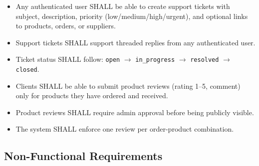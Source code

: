 \documentclass[12pt,onecolumn]{IEEEtran}
\begin{document}
\begin{tcolorbox}[reqbox,title={FR-SUPPORT: Support and Review Requirements}]
\begin{itemize}[leftmargin=1.5em]
  \item {} Any authenticated user SHALL be able to create support tickets with subject, description, priority (low/medium/high/urgent), and optional links to products, orders, or suppliers.
  \item {} Support tickets SHALL support threaded replies from any authenticated user.
  \item {} Ticket status SHALL follow: \texttt{open} $\to$ \texttt{in\_progress} $\to$ \texttt{resolved} $\to$ \texttt{closed}.
  \item {} Clients SHALL be able to submit product reviews (rating 1--5, comment) only for products they have ordered and received.
  \item {} Product reviews SHALL require admin approval before being publicly visible.
  \item {} The system SHALL enforce one review per order-product combination.
\end{itemize}
\end{tcolorbox}

\subsection{Non-Functional Requirements}
\end{document}
